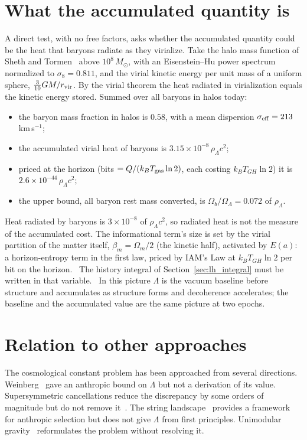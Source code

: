 \section{What the accumulated quantity is}\label{sec:lh_accum}
A direct test, with no free factors, asks whether the accumulated quantity could be the heat that baryons radiate as they virialize.
Take the halo mass function of Sheth and Tormen~\cite{ShethTormen1999} above $10^8\,M_\odot$, with an Eisenstein--Hu power
spectrum~\cite{EisensteinHu1998} normalized to $\sigma_8=0.811$, and the virial kinetic energy per unit mass of a uniform sphere,
$\tfrac{3}{10}GM/r_{\rm vir}$. By the virial theorem the heat radiated in virialization equals the kinetic energy stored. Summed over all
baryons in halos today:
\begin{itemize}
\item the baryon mass fraction in halos is $0.58$, with a mean dispersion $\sigma_{\rm eff}=213$\,km\,s$^{-1}$; \calc
\item the accumulated virial heat of baryons is $3.15\times10^{-8}\,\rho_\Lambda c^2$; \calc
\item priced at the horizon (bits $=Q/(k_BT_{\rm gas}\ln2)$, each costing $k_BT_{GH}\ln2$) it is $2.6\times10^{-44}\,\rho_\Lambda c^2$; \calc
\item the upper bound, all baryon rest mass converted, is $\Omega_b/\Omega_\Lambda=0.072$ of $\rho_\Lambda$. \calc
\end{itemize}
Heat radiated by baryons is $3\times10^{-8}$ of $\rho_\Lambda c^2$, so radiated heat is not the measure of the accumulated cost. The
informational term's size is set by the virial partition of the matter itself, $\beta_m=\Omega_m/2$ (the kinetic half), activated by
$E(a)$: a horizon-entropy term in the first law, priced by IAM's Law at $k_BT_{GH}\ln2$ per bit on the horizon. \interp\ The history
integral of Section~\ref{sec:lh_integral} must be written in that variable. \openprob\ In this picture $\Lambda$ is the vacuum baseline
before structure and accumulates as structure forms and decoherence accelerates; the baseline and the accumulated value are the same
picture at two epochs. \interp

\section{Relation to other approaches}\label{sec:lh_prior}
The cosmological constant problem has been approached from several directions. Weinberg~\cite{Weinberg1989} gave an anthropic bound on
$\Lambda$ but not a derivation of its value. Supersymmetric cancellations reduce the discrepancy by some orders of magnitude but do not
remove it~\cite{Witten2001}. The string landscape~\cite{BoussoPolchinski2000} provides a framework for anthropic selection but does
not give $\Lambda$ from first principles. Unimodular gravity~\cite{Weinberg1989} reformulates the problem without resolving it.

